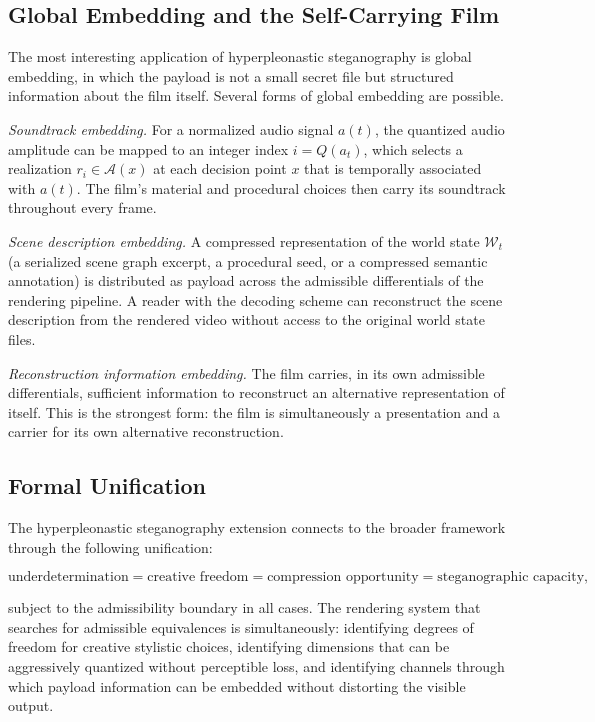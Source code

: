 \documentclass[11pt,a4paper]{article}
\theoremstyle{plain}
\theoremstyle{definition}
\theoremstyle{remark}
\begin{document}
\subsection{Global Embedding and the Self-Carrying Film}

The most interesting application of hyperpleonastic steganography is global embedding, in which the payload is not a small secret file but structured information about the film itself. Several forms of global embedding are possible.

\textit{Soundtrack embedding.} For a normalized audio signal $a(t)$, the quantized audio amplitude can be mapped to an integer index $i = Q(a_t)$, which selects a realization $r_i \in \mathcal{A}(x)$ at each decision point $x$ that is temporally associated with $a(t)$. The film's material and procedural choices then carry its soundtrack throughout every frame.

\textit{Scene description embedding.} A compressed representation of the world state $\mathcal{W}_t$ (a serialized scene graph excerpt, a procedural seed, or a compressed semantic annotation) is distributed as payload across the admissible differentials of the rendering pipeline. A reader with the decoding scheme can reconstruct the scene description from the rendered video without access to the original world state files.

\textit{Reconstruction information embedding.} The film carries, in its own admissible differentials, sufficient information to reconstruct an alternative representation of itself. This is the strongest form: the film is simultaneously a presentation and a carrier for its own alternative reconstruction.

\subsection{Formal Unification}

The hyperpleonastic steganography extension connects to the broader framework through the following unification:

\[
\text{underdetermination} = \text{creative freedom} = \text{compression opportunity} = \text{steganographic capacity},
\]

subject to the admissibility boundary in all cases. The rendering system that searches for admissible equivalences is simultaneously: identifying degrees of freedom for creative stylistic choices, identifying dimensions that can be aggressively quantized without perceptible loss, and identifying channels through which payload information can be embedded without distorting the visible output.
\end{document}
